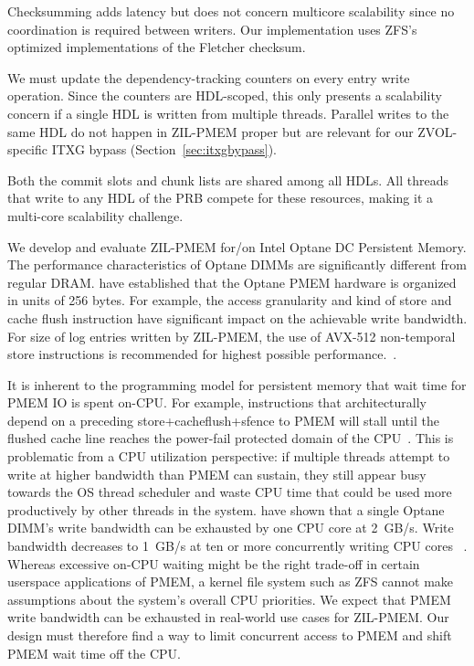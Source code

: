 \documentclass[12pt,a4paper,twoside]{book}
\begin{document}
\begin{description}[noitemsep]
    \item[Checksumming] Checksumming adds latency but does not concern multicore scalability since no coordination is required between writers.
        Our implementation uses ZFS's optimized implementations of the Fletcher checksum.
    \item[Dependency Tracking Counters] We must update the dependency-tracking counters on every entry write operation.
        Since the counters are HDL-scoped, this only presents a scalability concern if a single HDL is written from multiple threads.
        Parallel writes to the same HDL do not happen in ZIL-PMEM proper but are relevant for our ZVOL-specific ITXG bypass (Section~\ref{sec:itxgbypass}).
    \item[Commit Slot Acquisition \& Chunk Replacement]
        Both the commit slots and chunk lists are shared among all HDLs.
        All threads that write to any HDL of the PRB compete for these resources, making it a multi-core scalability challenge.
    \item[Optane Characteristics] We develop and evaluate ZIL-PMEM for/on Intel Optane DC Persistent Memory.
        The performance characteristics of Optane DIMMs are significantly different from regular DRAM.
        \citeauthor{yangEmpiricalGuideBehavior2020} have established that the Optane PMEM hardware is organized in units of 256 bytes.
        For example, the access granularity and kind of store and cache flush instruction have significant impact on the achievable write bandwidth.
        For size of log entries written by ZIL-PMEM, the use of  AVX-512 non-temporal store instructions is recommended for highest possible performance.~\cite{yangEmpiricalGuideBehavior2020}.
    \item[PMEM Bandwidth Limits \& Multicore Scalability]
        It is inherent to the programming model for persistent memory that wait time for PMEM IO is spent on-CPU.
        For example, instructions that architecturally depend on a preceding store+cacheflush+sfence to PMEM will stall until the flushed cache line reaches the power-fail protected domain of the CPU~\cite{Scargall2020}.
        This is problematic from a CPU utilization perspective:
        if multiple threads attempt to write at higher bandwidth than PMEM can sustain, they still appear busy towards the OS thread scheduler and waste CPU time that could be used more productively by other threads in the system.
        \citeauthor{yangEmpiricalGuideBehavior2020} have shown that a single Optane DIMM's write bandwidth can be exhausted by one CPU core at 2~GB/s.
        Write bandwidth decreases to 1~GB/s at ten or more concurrently writing CPU cores ~\cite{yangEmpiricalGuideBehavior2020}.
        Whereas excessive on-CPU waiting might be the right trade-off in certain userspace applications of PMEM, a kernel file system such as ZFS cannot make assumptions about the system's overall CPU priorities.
        We expect that PMEM write bandwidth can be exhausted in real-world use cases for ZIL-PMEM.
        Our design must therefore find a way to limit concurrent access to PMEM and shift PMEM wait time off the CPU.
\end{description}
\end{document}

